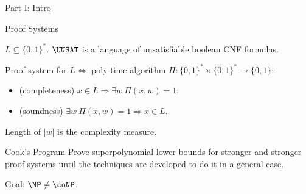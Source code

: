 \begin{frame}

    \begin{center}
        \Huge Part I: Intro
    \end{center}
    
\end{frame}

\begin{frame}{Proof Systems}

	$L \subseteq \{0, 1\}^*$. $\UNSAT$ is a language of unsatisfiable boolean CNF formulas.
    \pause

    \begin{definition}
        Proof system for $L \Leftrightarrow$ poly-time algorithm
        $\Pi\colon \{0, 1\}^* \times \{0, 1\}^* \rightarrow \{0, 1\}$:
        \begin{itemize}
            \item (completeness) $x \in L \Rightarrow \exists w ~ \Pi(x, w) = 1$;
            \item (soundness) $\exists w ~ \Pi(x, w) = 1 \Rightarrow x \in L$.
        \end{itemize}
    \end{definition}

    Length of $|w|$ is the complexity measure.

    \pause

    \begin{block}{Cook's Program}
        Prove superpolynomial lower bounds for stronger and stronger proof systems until the techniques
        are developed to do it in a general case.

        Goal: $\NP \neq \coNP$.
    \end{block}
\end{frame}

